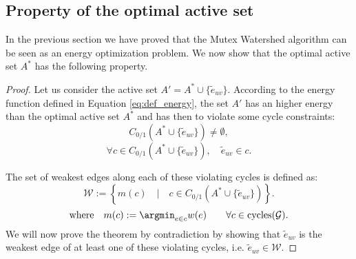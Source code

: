 \subsection{Property of the optimal active set}
In the previous section we have proved that the Mutex Watershed algorithm can be seen as an energy optimization problem. We now show that the optimal active set $A^*$ has the following property. %
\pathTheorem*
\begin{proof}
Let us consider the active set $A' = A^* \cup \{ \tilde{e}_{uv}\}$. According to the energy function defined in Equation \ref{eq:def_energy}, the set $A'$ has an higher energy than the optimal active set $A^*$ and has then to violate some cycle constraints:
\begin{equation}
C_{0/1}(A^* \cup \{ \tilde{e}_{uv}\}) \neq \emptyset,
\end{equation}
\begin{equation}
\forall c \in C_{0/1}(A^* \cup \{ \tilde{e}_{uv}\}), \quad \tilde{e}_{uv} \in c.
\end{equation}


The set of weakest edges along each of these violating cycles is defined as:
\begin{equation}
\mathcal{W} := \left\{ m(c) \quad \Big| \quad c \in C_{0/1}(A^* \cup \{ \tilde{e}_{uv}\})  \right\}.
\end{equation}
\begin{equation}
\mathrm{where}\quad  m(c) := \argmin_{e \in c} w(e) \qquad \forall c \in \text{cycles}(\mathcal{G}).
\end{equation}
We will now prove the theorem by contradiction by showing that $\tilde{e}_{uv}$ is the weakest edge of at least one of these violating cycles, i.e. $\tilde{e}_{uv} \in \mathcal{W}$. 


\end{proof}
